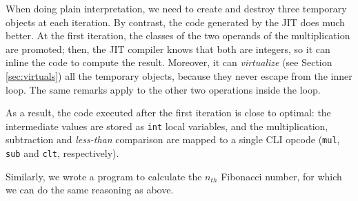 When doing plain interpretation, we need to create and destroy three temporary
objects at each iteration.  By contrast, the code generated by the JIT does
much better.  At the first iteration, the classes of the two operands of the
multiplication are promoted; then, the JIT compiler knows that both are
integers, so it can inline the code to compute the result.  Moreover, it can
\emph{virtualize} (see Section \ref{sec:virtuals}) all the temporary objects, because they never escape from
the inner loop.  The same remarks apply to the other two operations inside
the loop.

As a result, the code executed after the first iteration is close to optimal:
the intermediate values are stored as \lstinline{int} local variables, and the
multiplication, subtraction and \emph{less-than} comparison are mapped to a
single CLI opcode (\lstinline{mul}, \lstinline{sub} and \lstinline{clt},
respectively).

Similarly, we wrote a program to calculate the $n_{th}$ Fibonacci number, for
which we can do the same reasoning as above.

